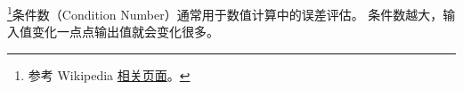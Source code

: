 
\begin{issues}
\issueDraft
\end{issues}

\footnote{参考 Wikipedia \href{https://en.wikipedia.org/wiki/Condition_number}{相关页面}。}条件数（Condition Number）通常用于数值计算中的误差评估。 条件数越大，输入值变化一点点输出值就会变化很多。

